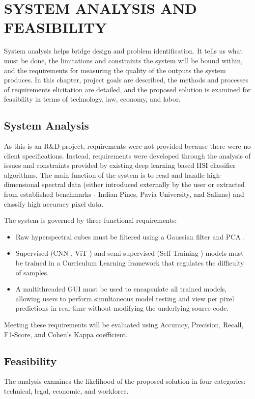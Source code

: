 \chapter{SYSTEM ANALYSIS AND FEASIBILITY}
System analysis helps bridge design and problem identification. It tells us what must be done, the limitations and constraints the system will be bound within, and the requirements for measuring the quality of the outputs the system produces. In this chapter, project goals are described, the methods and processes of requirements elicitation are detailed, and the proposed solution is examined for feasibility in terms of technology, law, economy, and labor.

\section{System Analysis}
As this is an R\&D project, requirements were not provided because there were no client specifications. Instead, requirements were developed through the analysis of issues and constraints provided by existing deep learning based HSI classifier algorithms. The main function of the system is to read and handle high-dimensional spectral data (either introduced externally by the user or extracted from established benchmarks - Indian Pines, Pavia University, and Salinas) and classify high accuracy pixel data.

The system is governed by three functional requirements:
\begin{itemize}
    \item Raw hyperspectral cubes must be filtered using a Gaussian filter and PCA \cite{pedregosa2011scikit}.
    \item Supervised (CNN \cite{chen2016deep}, ViT \cite{dosovitskiy2020image}) and semi-supervised (Self-Training \cite{triguero2015self}) models must be trained in a Curriculum Learning framework \cite{bengio2009curriculum} that regulates the difficulty of samples.
    \item A multithreaded GUI must be used to encapsulate all trained models, allowing users to perform simultaneous model testing and view per pixel predictions in real-time without modifying the underlying source code.
\end{itemize}

Meeting these requirements will be evaluated using Accuracy, Precision, Recall, F1-Score, and Cohen’s Kappa coefficient.

\section{Feasibility}
The analysis examines the likelihood of the proposed solution in four categories: technical, legal, economic, and workforce.

